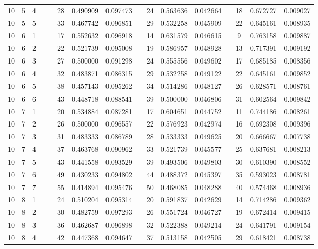 \begin{appendix}
\begin{longtable}[h]{rrrccccccccccccc}
10	&	5	&	4	&&&	28	&	0.490909	&	0.097473	&&	24	&	0.563636	&	0.042664	&&	18	&	0.672727	&	0.009027	\\
10	&	5	&	5	&&&	33	&	0.467742	&	0.096851	&&	29	&	0.532258	&	0.045909	&&	22	&	0.645161	&	0.008935	\\
10	&	6	&	1	&&&	17	&	0.552632	&	0.096918	&&	14	&	0.631579	&	0.046615	&&	9	&	0.763158	&	0.009887	\\
10	&	6	&	2	&&&	22	&	0.521739	&	0.095008	&&	19	&	0.586957	&	0.048928	&&	13	&	0.717391	&	0.009192	\\
10	&	6	&	3	&&&	27	&	0.500000	&	0.091298	&&	24	&	0.555556	&	0.049602	&&	17	&	0.685185	&	0.008356	\\
10	&	6	&	4	&&&	32	&	0.483871	&	0.086315	&&	29	&	0.532258	&	0.049122	&&	22	&	0.645161	&	0.009852	\\
10	&	6	&	5	&&&	38	&	0.457143	&	0.095262	&&	34	&	0.514286	&	0.048127	&&	26	&	0.628571	&	0.008761	\\
10	&	6	&	6	&&&	43	&	0.448718	&	0.088541	&&	39	&	0.500000	&	0.046806	&&	31	&	0.602564	&	0.009842	\\
10	&	7	&	1	&&&	20	&	0.534884	&	0.087281	&&	17	&	0.604651	&	0.044752	&&	11	&	0.744186	&	0.008261	\\
10	&	7	&	2	&&&	26	&	0.500000	&	0.096557	&&	22	&	0.576923	&	0.042974	&&	16	&	0.692308	&	0.009396	\\
10	&	7	&	3	&&&	31	&	0.483333	&	0.086789	&&	28	&	0.533333	&	0.049625	&&	20	&	0.666667	&	0.007738	\\
10	&	7	&	4	&&&	37	&	0.463768	&	0.090962	&&	33	&	0.521739	&	0.045577	&&	25	&	0.637681	&	0.008213	\\
10	&	7	&	5	&&&	43	&	0.441558	&	0.093529	&&	39	&	0.493506	&	0.049803	&&	30	&	0.610390	&	0.008552	\\
10	&	7	&	6	&&&	49	&	0.430233	&	0.094802	&&	44	&	0.488372	&	0.045397	&&	35	&	0.593023	&	0.008781	\\
10	&	7	&	7	&&&	55	&	0.414894	&	0.095476	&&	50	&	0.468085	&	0.048288	&&	40	&	0.574468	&	0.008936	\\
10	&	8	&	1	&&&	24	&	0.510204	&	0.095314	&&	20	&	0.591837	&	0.042629	&&	14	&	0.714286	&	0.009362	\\
10	&	8	&	2	&&&	30	&	0.482759	&	0.097293	&&	26	&	0.551724	&	0.046727	&&	19	&	0.672414	&	0.009415	\\
10	&	8	&	3	&&&	36	&	0.462687	&	0.096898	&&	32	&	0.522388	&	0.049214	&&	24	&	0.641791	&	0.009154	\\
10	&	8	&	4	&&&	42	&	0.447368	&	0.094647	&&	37	&	0.513158	&	0.042505	&&	29	&	0.618421	&	0.008738	\\

\end{longtable}
\end{appendix}
